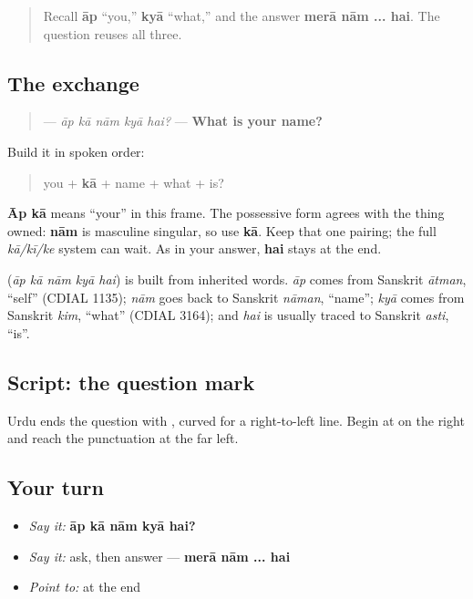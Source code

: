\begin{quote}
Recall \textbf{āp} “you,” \textbf{kyā} “what,” and the answer \textbf{merā nām ... hai}. The question reuses all three.
\end{quote}

\subsection*{The exchange}
\begin{quote}
\textbf{    } — \emph{āp kā nām kyā hai?} — \textbf{What is your name?}
\end{quote}

Build it in spoken order:

\begin{quote}
you + \textbf{kā} + name + what + is?
\end{quote}

\textbf{Āp kā} means “your” in this frame. The possessive form agrees with the thing owned: \textbf{nām} is masculine singular, so use \textbf{kā}. Keep that one pairing; the full \emph{kā/kī/ke} system can wait. As in your answer, \textbf{hai} stays at the end.

\begin{cousinweb}
\textbf{    } (\emph{āp kā nām kyā hai}) is built from inherited words. \emph{āp} comes from Sanskrit \emph{ātman}, \textquotedblleft{}self\textquotedblright{} (CDIAL 1135); \emph{nām} goes back to Sanskrit \emph{nāman}, \textquotedblleft{}name\textquotedblright{}; \emph{kyā} comes from Sanskrit \emph{kim}, \textquotedblleft{}what\textquotedblright{} (CDIAL 3164); and \emph{hai} is usually traced to Sanskrit \emph{asti}, \textquotedblleft{}is\textquotedblright{}.
\end{cousinweb}

\subsection*{Script: the question mark}
Urdu ends the question with \textbf{}, curved for a right-to-left line. Begin at \textbf{} on the right and reach the punctuation at the far left.

\subsection*{Your turn}
\begin{itemize}
\raggedright
  \item \emph{Say it:} \textbf{āp kā nām kyā hai?}
  \item \emph{Say it:} ask, then answer — \textbf{merā nām ... hai}
  \item \emph{Point to:} \textbf{} at the end
\end{itemize}

